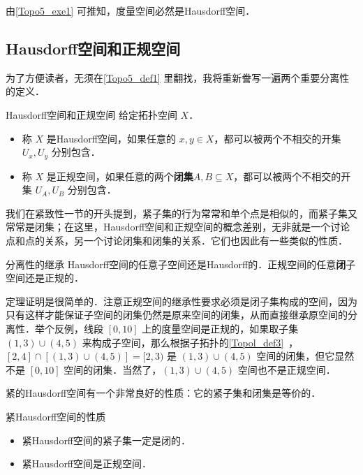 \begin{corollary}{}
由\autoref{Topo5_exe1} 可推知，度量空间必然是Hausdorff空间．
\end{corollary}

\subsection{Hausdorff空间和正规空间}

为了方便读者，无须在\autoref{Topo5_def1} 里翻找，我将重新誊写一遍两个重要分离性的定义．

\begin{definition}{Hausdorff空间和正规空间}\label{Topo5_def2}
给定拓扑空间 $X$．
\begin{itemize}
\item 称 $X$ 是Hausdorff空间，如果任意的 $x,y\in X$，都可以被两个不相交的开集 $U_x, U_y$ 分别包含．
\item 称 $X$ 是正规空间，如果任意的两个\textbf{闭集}$A, B\subseteq X$，都可以被两个不相交的开集 $U_A, U_B$ 分别包含．
\end{itemize}
\end{definition}

我们在紧致性一节的开头提到，紧子集的行为常常和单个点是相似的，而紧子集又常常是闭集；在这里，Hausdorff空间和正规空间的概念差别，无非就是一个讨论点和点的关系，另一个讨论闭集和闭集的关系．它们也因此有一些类似的性质．

\begin{theorem}{分离性的继承}
Hausdorff空间的任意子空间还是Hausdorff的．正规空间的任意\textbf{闭}子空间还是正规的．
\end{theorem}

定理证明是很简单的．注意正规空间的继承性要求必须是闭子集构成的空间，因为只有这样才能保证子空间的闭集仍然是原来空间的闭集，从而直接继承原空间的分离性．举个反例，线段 $[0,10]$ 上的度量空间是正规的，如果取子集 $(1,3)\cup(4,5)$ 来构成子空间，那么根据子拓扑的\autoref{Topol_def3}~，$[2,4]\cap[(1,3)\cup(4,5)]=[2,3)$ 是 $(1,3)\cup(4,5)$ 空间的闭集，但它显然不是 $[0,10]$ 空间的闭集．当然了，$(1,3)\cup(4,5)$ 空间也不是正规空间．

紧的Hausdorff空间有一个非常良好的性质：它的紧子集和闭集是等价的．
\begin{theorem}{紧Hausdorff空间的性质}
\begin{itemize}
\item 紧Hausdorff空间的紧子集一定是闭的．
\item 紧Hausdorff空间是正规空间．

\end{itemize}
\end{theorem}

